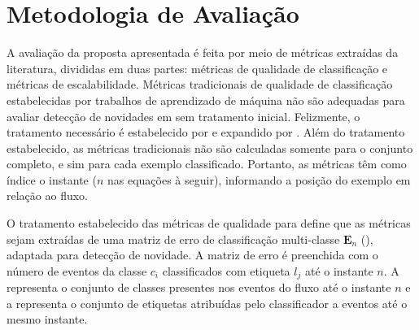 



\FloatBarrier

\section{Metodologia de Avaliação}\label{sec:esperados}


A avaliação da proposta apresentada é feita por meio de métricas extraídas da
literatura, divididas em duas partes: métricas de qualidade de classificação
e métricas de escalabilidade.
Métricas tradicionais de qualidade de classificação estabelecidas por trabalhos
de aprendizado de máquina não são adequadas para avaliar detecção de novidades em
\streams sem tratamento inicial. Felizmente, o tratamento necessário é
estabelecido por  e expandido por
.
Além do tratamento estabelecido, as métricas tradicionais não são calculadas
somente para o conjunto completo, e sim para cada exemplo classificado.
Portanto, as métricas têm como índice o instante ($n$ nas equações à seguir),
informando a posição do exemplo em relação ao fluxo.

O tratamento estabelecido das métricas de qualidade para \streamMining define
que as métricas sejam extraídas de uma matriz de erro de classificação
multi-classe $\mathbf{E}_n$ (), adaptada para detecção de
novidade.
A matriz de erro é preenchida com o número de eventos da classe $c_i$ classificados com
etiqueta $l_j$ até o instante $n$.
A  representa o conjunto de classes presentes nos eventos
do fluxo até o instante $n$ e a  representa o conjunto
de etiquetas atribuídas pelo classificador a eventos até o mesmo instante.

